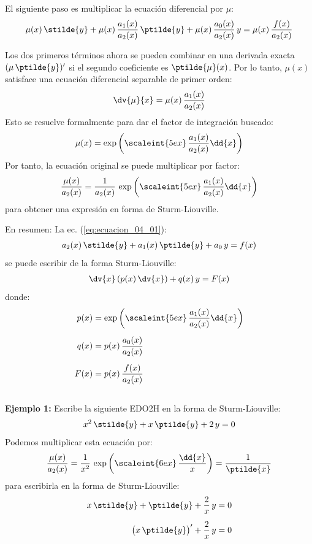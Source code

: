 El siguiente paso es multiplicar la ecuación diferencial por $\mu$:
\begin{align*}
\mu(x) \, \stilde{y} + \mu(x) \, \dfrac{a_{1}(x)}{a_{2}(x)} \, \ptilde{y} + \mu(x) \, \dfrac{a_{0}(x)}{a_{2}(x)} \, y = \mu(x) \, \dfrac{f(x)}{a_{2}(x)}
\end{align*}

Los dos primeros términos ahora se pueden combinar en una derivada exacta $( \mu \, \ptilde{y})^{\prime}$  si el segundo coeficiente es $\ptilde{\mu} (x)$. Por lo tanto, $\mu (x)$ satisface una ecuación diferencial separable de primer orden:
\begin{align*}
\dv{\mu}{x} = \mu (x) \, \dfrac{a_{1}(x)}{a_{2} (x)}
\end{align*}
Esto se resuelve formalmente para dar el factor de integración buscado:
\begin{align*}
\mu (x) = \exp \left( \scaleint{5ex} \, \dfrac{a_{1}(x)}{a_{2}(x)} \dd{x} \right)
\end{align*}
Por tanto, la ecuación original se puede multiplicar por factor:
\begin{align*}
\dfrac{\mu(x)}{a_{2}(x)} = \dfrac{1}{a_{2}(x)} \, \exp \left( \scaleint{5ex} \, \dfrac{a_{1}(x)}{a_{2}(x)} \dd{x} \right)
\end{align*}
para obtener una expresión en forma de Sturm-Liouville.
\par
\noindent
En resumen: La ec. (\ref{eq:ecuacion_04_01}):
\begin{align}
a_{2} (x) \, \stilde{y} + a_{1} (x) \, \ptilde{y} + a_{0} \, y = f(x)
\label{eq:ecuacion_04_07}
\end{align}
se puede escribir de la forma Sturm-Liouville:
\begin{align}
\dv{x} \left( p(x) \, \dv{x} \right) + q(x) \, y =  F(x)
\label{eq:ecuacion_04_08}
\end{align}
donde:
\begin{align}
\begin{aligned}
p(x) &= \exp \left( \scaleint{5ex} \, \dfrac{a_{1}(x)}{a_{2}(x)} \dd{x} \right) \\[0.5em]
q(x) &= p(x) \, \dfrac{a_{0}(x)}{a_{2}(x)} \\[0.5em]
F(x) &= p(x) \, \dfrac{f(x)}{a_{2}(x)}
\end{aligned}
\label{eq:ecuacion_04_09}
\end{align}
\\[0.5em]
\textbf{Ejemplo 1: }\label{Ejemplo_01} Escribe la siguiente EDO2H en la forma de Sturm-Liouville:
\begin{align*}
x^{2} \, \stilde{y} + x \, \ptilde{y} + 2 \, y = 0
\end{align*}
Podemos multiplicar esta ecuación por:
\begin{align*}
\dfrac{\mu (x)}{a_{2}(x)} = \dfrac{1}{x^{2}} \, \exp \left( \scaleint{6ex} \, \dfrac{\dd{x}}{x} \right) = \dfrac{1}{\ptilde{x}}
\end{align*}
para escribirla en la forma de Sturm-Liouville:
\begin{align*}
x \, \stilde{y} + \ptilde{y} + \dfrac{2}{x} \, y &= 0 \\[0.5em]
\big( x \, \ptilde{y} \big)^{\prime} +  \dfrac{2}{x} \, y &= 0
\end{align*}

